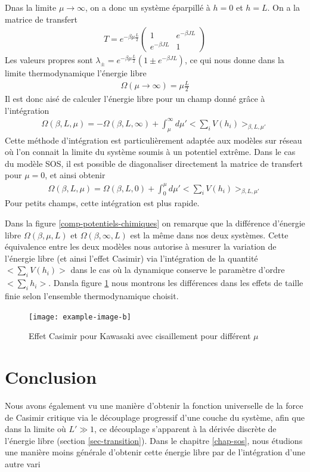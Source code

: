 Dnas la limite $\mu \rightarrow \infty$, on a donc un système éparpillé à $h=0$ et $h=L$. On a la matrice de transfert
\begin{align}
T= e^{-\beta \mu \frac{L}{2}}
  \begin{pmatrix}
    1 & e^{-\beta  J L} \\
    e^{-\beta  J L} & 1
  \end{pmatrix}
\end{align}
Les valeurs propres sont $\lambda_\pm = e^{- \beta \mu \frac{L}{2}}( 1 \pm e^{-\beta J L})$, ce qui nous donne dans la limite thermodynamique l'énergie libre 
\begin{align}
  \Omega(\mu \rightarrow \infty) = \mu \frac{L}{2}
\end{align}
Il est donc aisé de calculer l'énergie libre pour un champ donné grâce à l'intégration
\begin{align}
        \Omega(\beta,L,\mu) = -\Omega(\beta,L,\infty) + \int_{\mu}^\infty d\mu'  < \sum_i V(h_i) >_{\beta,L,\mu'} 
\end{align}
Cette méthode d'intégration est particulièrement adaptée aux modèles sur réseau où l'on connait la limite du système soumis à un potentiel extrême. Dans le cas du modèle SOS, il est possible de diagonaliser directement la matrice de transfert pour $\mu=0$, et ainsi obtenir
\begin{align}
        \Omega(\beta,L,\mu) =\Omega(\beta,L,0) + \int_{0}^\mu d\mu'  < \sum_i V(h_i) >_{\beta,L,\mu'} 
\end{align}
Pour petits champs, cette intégration est plus rapide.

Dans la figure \ref{comp-potentiels-chimiques} on remarque que la différence d'énergie libre $\Omega(\beta,\mu,L)$ et $\Omega(\beta,\infty,L)$ est la même dans nos deux systèmes. Cette équivalence entre les deux modèles nous autorise à mesurer la variation de l'énergie libre (et ainsi l'effet Casimir) via l'intégration de la quantité $<\sum_i V(h_i)>$ dans le cas où la dynamique conserve le paramètre d'ordre $<\sum_i h_i>$. 
Dansla figure \ref{casimir-kaw-glau} nous montrons les différences dans les effets de taille finie selon l'ensemble thermodynamique choisit. 

\begin{figure}
    \centering
	\texttt{[image: example-image-b]}
	\caption{Effet Casimir pour Kawasaki avec cisaillement pour différent $\mu$}
	\label{casimir-kaw-glau}
\end{figure}



    \section{Conclusion}
	
Nous avons également vu une manière d'obtenir la fonction universelle de la force de Casimir critique via le découplage progressif d'une couche du système, afin que dans la limite où $L' \gg 1$, ce découplage s'apparent à la dérivée discrète de l'énergie libre (section \ref{sec-transition}). Dans le chapitre \ref{chap-sos}, nous étudions une manière moins générale d'obtenir cette énergie libre par de l'intégration d'une autre vari
